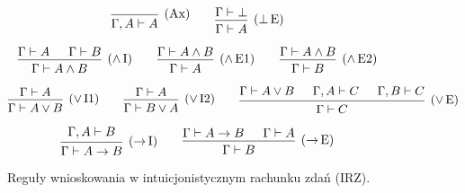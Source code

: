 \documentclass[polish,pretty]{angav}
\begin{document}
\begin{figure}[H]
    \[
    \begin{prooftree}
        \infer0[(Ax)]{\Gamma,A\vdash A}
    \end{prooftree}
    \qquad
    \begin{prooftree}
        \hypo{\Gamma\vdash \bot}
        \infer1[($\bot\!$ E)]{\Gamma\vdash A}
    \end{prooftree}
    \]

    \[
    \begin{prooftree}
        \hypo{\Gamma\vdash A}
        \hypo{\Gamma\vdash B}
        \infer2[($\land\!$ I)]{\Gamma\vdash A \land B}
    \end{prooftree}
    \qquad
    \begin{prooftree}
        \hypo{\Gamma\vdash A \land B}
        \infer1[($\land\!$ E1)]{\Gamma\vdash A}
    \end{prooftree}
    \qquad
    \begin{prooftree}
        \hypo{\Gamma\vdash A \land B}
        \infer1[($\land\!$ E2)]{\Gamma\vdash B}
    \end{prooftree}
    \]

    \[
    \begin{prooftree}
        \hypo{\Gamma\vdash A}
        \infer1[($\lor\!$ I1)]{\Gamma\vdash A \lor B}
    \end{prooftree}
    \qquad
    \begin{prooftree}
        \hypo{\Gamma\vdash A}
        \infer1[($\lor\!$ I2)]{\Gamma\vdash B \lor A}
    \end{prooftree}
    \qquad
    \begin{prooftree}
        \hypo{\Gamma\vdash A \lor B}
        \hypo{\Gamma,A\vdash C}
        \hypo{\Gamma,B\vdash C}
        \infer3[($\lor\!$ E)]{\Gamma\vdash C}
    \end{prooftree}
    \]

    \[
    \begin{prooftree}
        \hypo{\Gamma,A\vdash B}
        \infer1[($\to\!$ I)]{\Gamma\vdash A \to B}
    \end{prooftree}
    \qquad
    \begin{prooftree}
        \hypo{\Gamma\vdash A \to B}
        \hypo{\Gamma\vdash A}
        \infer2[($\to\!$ E)]{\Gamma\vdash B}
    \end{prooftree}
    \]
    \caption{Reguły wnioskowania w intuicjonistycznym rachunku zdań (IRZ).}
\end{figure}
\end{document}
